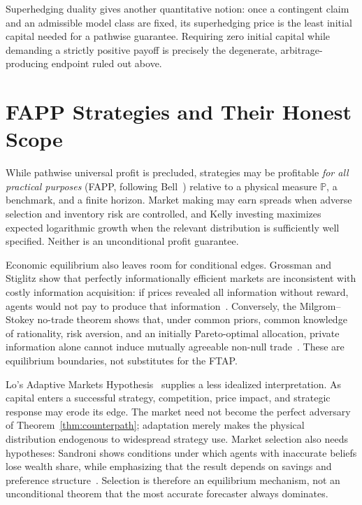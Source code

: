 \documentclass[aps,pra,reprint,superscriptaddress,amsmath,amssymb,floatfix]{revtex4-2}
\theoremstyle{plain}
\theoremstyle{definition}
\theoremstyle{remark}
\begin{document}
Superhedging duality gives another quantitative notion: once a contingent
claim and an admissible model class are fixed, its superhedging price is the
least initial capital needed for a pathwise guarantee. Requiring zero initial
capital while demanding a strictly positive payoff is precisely the
degenerate, arbitrage-producing endpoint ruled out above.

\section{FAPP Strategies and Their Honest Scope}
\label{sec:fapp}

While pathwise universal profit is precluded, strategies may be profitable
\emph{for all practical purposes} (FAPP, following Bell~\cite{bell-a})
relative to a physical measure \(\mathbb{P}\), a benchmark, and a finite
horizon. Market making may earn spreads when adverse selection and inventory
risk are controlled, and Kelly investing maximizes expected logarithmic
growth when the relevant distribution is sufficiently well specified. Neither
is an unconditional profit guarantee.

Economic equilibrium also leaves room for conditional edges. Grossman and
Stiglitz show that perfectly informationally efficient markets are
inconsistent with costly information acquisition: if prices revealed all
information without reward, agents would not pay to produce that
information~\cite{GrossmanStiglitz1980}. Conversely, the Milgrom--Stokey
no-trade theorem shows that, under common priors, common knowledge of
rationality, risk aversion, and an initially Pareto-optimal allocation, private
information alone cannot induce mutually agreeable non-null
trade~\cite{MilgromStokey1982}. These are equilibrium boundaries, not
substitutes for the FTAP.

Lo's Adaptive Markets Hypothesis~\cite{Lo2004} supplies a less idealized
interpretation. As capital enters a successful strategy, competition, price
impact, and strategic response may erode its edge. The market need not become
the perfect adversary of Theorem~\ref{thm:counterpath}; adaptation merely makes
the physical distribution endogenous to widespread strategy use. Market
selection also needs hypotheses: Sandroni shows conditions under which agents
with inaccurate beliefs lose wealth share, while emphasizing that the result
depends on savings and preference structure~\cite{Sandroni2000}. Selection is
therefore an equilibrium mechanism, not an unconditional theorem that the most
accurate forecaster always dominates.
\end{document}
